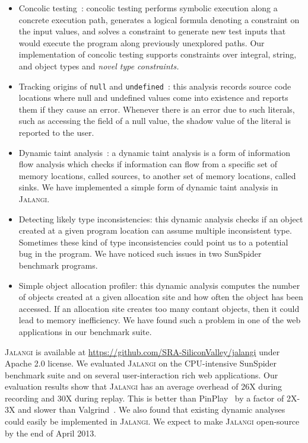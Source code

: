 \documentclass{sig-alternate}
\def\jalangi{\textsc{Jalangi}}
\begin{document}
\begin{itemize}
\item Concolic testing~\cite{dart,cute}: concolic testing performs
  symbolic execution along a concrete execution path, generates a
  logical formula denoting a constraint on the input values, and
  solves a constraint to generate new test inputs that would execute
  the program along previously unexplored paths.  Our implementation
  of concolic testing supports constraints over integral, string, and
  object types and \emph{novel type constraints.}
\item Tracking origins of \texttt{null} and
  \texttt{undefined}~\cite{Bond:2007:TBA:1297027.1297057}: this
  analysis records source code locations where null and undefined
  values come into existence and reports them if they cause an error.
  Whenever there is an error due to such literals, such as accessing
  the field of a null value, the shadow value of the literal is
  reported to the user.
\item Dynamic taint
  analysis~\cite{songndss05,Clause:2007:DGD:1273463.1273490}: a
  dynamic taint analysis is a form of information flow analysis which
  checks if information can flow from a specific set of memory
  locations, called sources, to another set of memory locations,
  called sinks.  We have implemented a simple form of dynamic taint
  analysis in \jalangi{}.
\item Detecting likely type inconsistencies: this dynamic analysis
  checks if an object created at a given program location can assume
  multiple inconsistent type.  Sometimes these kind of type
  inconsistencies could point us to a potential bug in the program.
  We have noticed such issues in two SunSpider benchmark programs.
\item Simple object allocation profiler: this dynamic analysis
  computes the number of objects created at a given allocation site
  and how often the object has been accessed.  If an allocation site
  creates too many contant objects, then it could lead to memory
  inefficiency.  We have found such a problem in one of the web
  applications in our benchmark suite.
\end{itemize}

\jalangi{} is available at
\url{https://github.com/SRA-SiliconValley/jalangi} under Apache 2.0
license.  We evaluated \jalangi{} on the CPU-intensive SunSpider
benchmark suite and on several user-interaction rich web applications.
Our evaluation results show that \jalangi{} has an average overhead of
26X during recording and 30X during replay.  This is better than
PinPlay~\cite{Patil:2010:PFD:1772954.1772958} by a factor of 2X-3X and
slower than Valgrind~\cite{Nethercote:2007:VFH:1250734.1250746}.  We
also found that existing dynamic analyses could easily be implemented
in \jalangi{}.  We expect to make \jalangi{} open-source by the end of
April 2013.
\end{document}

